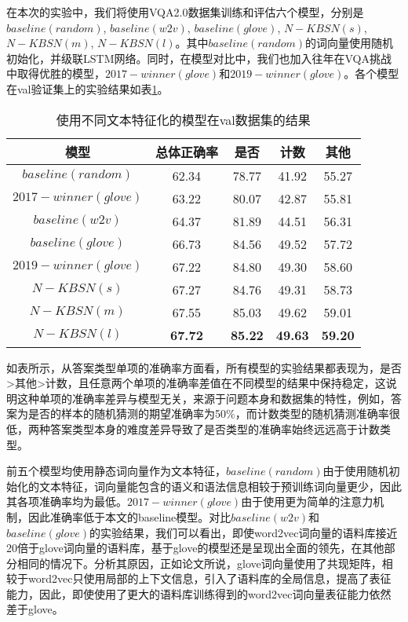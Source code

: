 在本次的实验中，我们将使用VQA2.0数据集训练和评估六个模型，分别是$baseline(random)$, $baseline(w2v)$, $baseline(glove)$, $N-KBSN(s)$, $N-KBSN(m)$, $N-KBSN(l)$。其中$baseline(random)$的词向量使用随机初始化，并级联LSTM网络。同时，在模型对比中，我们也加入往年在VQA挑战中取得优胜的模型，$2017-winner(glove)$和$2019-winner(glove)$。各个模型在val验证集上的实验结果如表\ref{5mresults}。
\begin{table}[H]
\centering
\caption{使用不同文本特征化的模型在val数据集的结果}
\begin{tabular}{c|cccc}
\toprule
模型 & 总体正确率 & 是否 & 计数 & 其他\\
\midrule
$baseline(random)$& 62.34 &  78.77 & 41.92 & 55.27\\
$2017-winner(glove)$ & 63.22 & 80.07 & 42.87 & 55.81\\
$baseline(w2v)$&  64.37 &  81.89 &  44.51 & 56.31\\
$baseline(glove)$&  66.73 & 84.56 &  49.52 & 57.72\\
$2019-winner(glove)$& 67.22 & 84.80 & 49.30 & 58.60\\
\midrule
$N-KBSN(s)$&  67.27& 84.76&  49.31& 58.73\\
$N-KBSN(m)$&  67.55& 85.03&  49.62& 59.01\\
$N-KBSN(l)$&  \textbf{67.72}& \textbf{85.22}&  \textbf{49.63}& \textbf{59.20}\\
\bottomrule
\end{tabular}
\label{5mresults}
\end{table}

如表所示，从答案类型单项的准确率方面看，所有模型的实验结果都表现为，是否>其他>计数，且任意两个单项的准确率差值在不同模型的结果中保持稳定，这说明这种单项的准确率差异与模型无关，来源于问题本身和数据集的特性，例如，答案为是否的样本的随机猜测的期望准确率为50\%，而计数类型的随机猜测准确率很低，两种答案类型本身的难度差异导致了是否类型的准确率始终远远高于计数类型。

前五个模型均使用静态词向量作为文本特征，$baseline(random)$由于使用随机初始化的文本特征，词向量能包含的语义和语法信息相较于预训练词向量更少，因此其各项准确率均为最低。$2017-winner(glove)$由于使用更为简单的注意力机制，因此准确率低于本文的baseline模型。对比$baseline(w2v)$和$baseline(glove)$的实验结果，我们可以看出，即使word2vec词向量的语料库接近20倍于glove词向量的语料库，基于glove的模型还是呈现出全面的领先，在其他部分相同的情况下。分析其原因，正如论文\cite{pennington2014glove}所说，glove词向量使用了共现矩阵，相较于word2vec只使用局部的上下文信息，引入了语料库的全局信息，提高了表征能力，因此，即使使用了更大的语料库训练得到的word2vec词向量表征能力依然差于glove。

